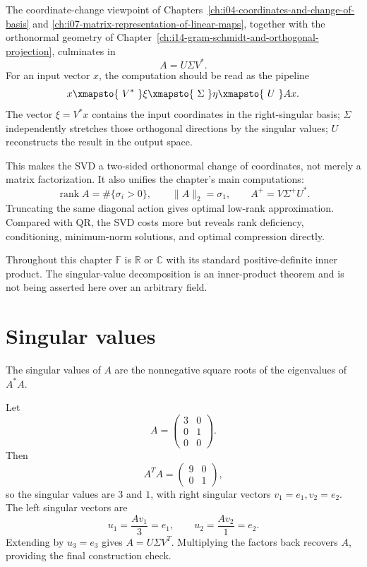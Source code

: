 \begin{remark}
The coordinate-change viewpoint of
Chapters~\ref{ch:i04-coordinates-and-change-of-basis} and
\ref{ch:i07-matrix-representation-of-linear-maps}, together with the
orthonormal geometry of
Chapter~\ref{ch:i14-gram-schmidt-and-orthogonal-projection}, culminates in
\[
A=U\Sigma V^*.
\]
For an input vector \(x\), the computation should be read as the pipeline
\[
x
\xmapsto{\ V^*\ }
\xi
\xmapsto{\ \Sigma\ }
\eta
\xmapsto{\ U\ }
Ax.
\]
The vector \(\xi=V^*x\) contains the input coordinates in the right-singular
basis; \(\Sigma\) independently stretches those orthogonal directions by the
singular values; \(U\) reconstructs the result in the output space.

This makes the SVD a two-sided orthonormal change of coordinates, not merely a
matrix factorization.  It also unifies the chapter's main computations:
\[
\operatorname{rank}A=\#\{\sigma_i>0\},\qquad
\|A\|_2=\sigma_1,\qquad
A^+=V\Sigma^+U^*.
\]
Truncating the same diagonal action gives optimal low-rank approximation.
Compared with QR, the SVD costs more but reveals rank deficiency, conditioning,
minimum-norm solutions, and optimal compression directly.
\end{remark}

\begin{remark}
Throughout this chapter \(\mathbb F\) is \(\mathbb R\) or \(\mathbb C\) with
its standard positive-definite inner product. The singular-value decomposition
is an inner-product theorem and is not being asserted here over an arbitrary
field.
\end{remark}

\section{Singular values}
The singular values of $A$ are the nonnegative square roots of the eigenvalues of $A^*A$.


\begin{example}\label{ex:i18-expand-01}
Let
\[
A=\begin{pmatrix}3&0\\0&1\\0&0\end{pmatrix}.
\]
Then
\[
A^TA=\begin{pmatrix}9&0\\0&1\end{pmatrix},
\]
so the singular values are \(3\) and \(1\), with right singular vectors
\(v_1=e_1,v_2=e_2\). The left singular vectors are
\[
u_1=\frac{Av_1}{3}=e_1,\qquad
u_2=\frac{Av_2}{1}=e_2.
\]
Extending by \(u_3=e_3\) gives \(A=U\Sigma V^T\). Multiplying the factors back
recovers \(A\), providing the final construction check.
\end{example}
